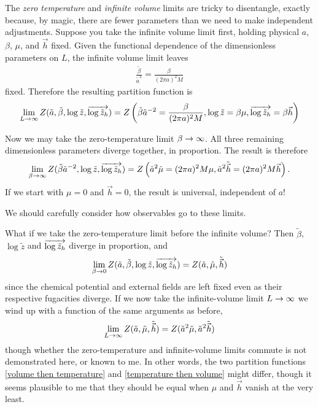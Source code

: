 The \emph{zero temperature} and \emph{infinite volume} limits are tricky to disentangle, exactly because, by magic, there are fewer parameters than we need to make independent adjustments.
Suppose you take the infinite volume limit first, holding physical $a$, $\beta$, $\mu$, and $\vec{h}$ fixed.
Given the functional dependence of the dimensionless parameters on $L$, the infinite volume limit leaves
\begin{align}
    \frac{\tilde{\beta}}{\tilde{a}^2} = \frac{\beta}{(2\pi a)^2 M}
\end{align}
fixed.
Therefore the resulting partition function is
\begin{align}
    \lim_{L\rightarrow\infty} Z(\tilde{a}, \tilde{\beta}, \log\tilde{z}, \overrightarrow{\log \tilde{z}_h})
    =
    Z\left(
        \tilde{\beta}\tilde{a}^{-2} = \frac{\beta}{(2\pi a)^2 M},
        \log\tilde{z} = \beta \mu,
        \overrightarrow{\log \tilde{z}_h} = \beta \vec{h}
        \right)
    \label{eq:infinite volume}
\end{align}

Now we may take the zero-temperature limit $\beta\rightarrow\infty$.
All three remaining dimensionless parameters diverge together, in proportion.
The result is therefore
\begin{align}
    \lim_{\beta\rightarrow\infty} Z(\tilde{\beta}\tilde{a}^{-2}, \log\tilde{z}, \overrightarrow{\log \tilde{z}_h})
    =
    Z\left( \tilde{a}^2\tilde{\mu} = (2\pi a)^2 M \mu, \tilde{a}^2 \tilde{\vec{h}} = (2\pi a)^2 M \vec{h} \right).
    \label{eq:volume then temperature}
\end{align}
If we start with $\mu=0$ and $\vec{h}=0$, the result is universal, independent of $a$!

We should carefully consider how observables go to these limits.

What if we take the zero-temperature limit before the infinite volume?
Then $\tilde{\beta}$, $\log\tilde{z}$ and $\overrightarrow{\log\tilde{z}_h}$ diverge in proportion, and 
\begin{align}
    \lim_{\beta\rightarrow0} Z(\tilde{a}, \tilde{\beta}, \log\tilde{z}, \overrightarrow{\log \tilde{z}_h})
    =
    Z(\tilde{a}, \tilde{\mu}, \tilde{\vec{h}})
\end{align}
since the chemical potential and external fields are left fixed even as their respective fugacities diverge.
If we now take the infinite-volume limit $L\rightarrow\infty$ we wind up with a function of the same arguments as before,
\begin{align}
    \lim_{L\rightarrow\infty}
    Z(\tilde{a}, \tilde{\mu}, \tilde{\vec{h}})
    =
    Z( \tilde{a}^2\tilde{\mu}, \tilde{a}^2 \tilde{\vec{h}} )
    \label{eq:temperature then volume}
\end{align}
though whether the zero-temperature and infinite-volume limits commute is not demonstrated here, or known to me.
In other words, the two partition functions \eqref{volume then temperature} and \eqref{temperature then volume} might differ, though it seems plausible to me that they should be equal when $\mu$ and $\vec{h}$ vanish at the very least.

